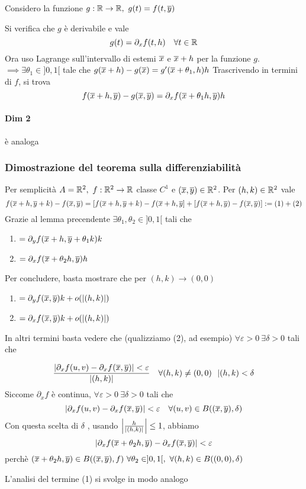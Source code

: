 \documentclass[a4paper]{article}
\begin{document}
Considero la funzione $g: \R \to \R,\ g(t)=f(t, \oy) $

Si verifica che $g$ è derivabile e vale
$$
g(t) = \partial_x f (t,h) \quad \forall t \in \mathbb{R}
$$
Ora uso Lagrange sull'intervallo di estemi $\overline{x}$ e $\overline{x} + h$ per la funzione $g$. $\implies \exists \theta_1 \in ]0,1[$
tale che $g(\overline{x} +h ) - g(\overline{x}) = g'(\overline{x} + \theta_1, h) h $
Trascrivendo in termini di $f$, si trova
$$
f(\overline{x}+h , \overline{y}) - g(\overline{x}, \overline{y}) = \partial_x f(\overline{x}+\theta_1 h, \overline{y})h
$$
\paragraph{Dim 2} è analoga

\subsubsection{ Dimostrazione del teorema sulla differenziabilità}
Per semplicità $A=\mathbb{R}^2,\ f:\mathbb{R}^2 \to \mathbb{R}$ classe $C^1$ e $(\overline{x},\overline{y}) \in \mathbb{R}^2$. Per $(h,k) \in \mathbb{R}^2$ vale
$$
f(\overline{x}+h,\overline{y}+k)-f(\overline{x},\overline{y})=[f(\overline{x}+h,\overline{y}+k)-f(\overline{x}+h,\overline{y}]+[f(\overline{x}+h,\overline{y})-f(\overline{x},\overline{y})] := (1)+(2)
$$
Grazie al lemma precendente $ \exists \theta_1 , \theta_2 \in ]0,1[$ tali che
\begin{enumerate}
	\item $= \partial_y f (\overline{x} +h , \overline{y} + \theta_1 k) k $
	\item $= \partial_x f (\overline{x} + \theta_2 h , \overline{y} ) h $
\end{enumerate}
Per concludere, basta mostrare che per $(h,k) \to (0,0) $
\begin{enumerate}
	\item $= \partial_y f ( \overline{x} , \overline{y} ) k + o(|(h,k)|) $
	\item $= \partial_x f (\overline{x} , \overline{y}) k + o(|(h,k)|) $
\end{enumerate}
In altri termini basta vedere che (qualizziamo (2), ad esempio)
$ \forall \varepsilon > 0 \ \exists \delta >0$ tali che 

$$ {  | \partial_x f(u,v) - \partial_x f (\overline{x} , \overline{y}) | < \varepsilon 
\over |(h,k)|
} \quad \forall (h,k) \neq (0,0) \ \ |(h,k) < \delta $$
Siccome $\partial_xf$ è continua, $ \forall \varepsilon > 0 \ \exists \delta > 0$ tali che 
$$
| \partial_xf(u,v) - \partial_xf (\overline{x}, \overline{y}) | < \varepsilon \quad
\forall (u,v) \in B((\overline{x} , \overline{y} ) , \delta)
$$
Con questa scelta di $\delta$ , usando $\left |{ h \over |(h,k)| } \right | \le 1 $, abbiamo
$$ | \partial_xf( \overline{x} + \theta_2h , \overline{y} ) - \partial_xf ( \overline{x} , \overline{y}) | < \varepsilon $$
perchè $( \overline{x} + \theta_2 h , \overline{y} ) \in B (( \overline{x},\overline{y}), f) \ \forall \theta_2 \in ]0,1[, \ \forall (h,k) \in B((0,0), \delta) $

L'analisi del termine (1) si svolge in modo analogo
\end{document}
